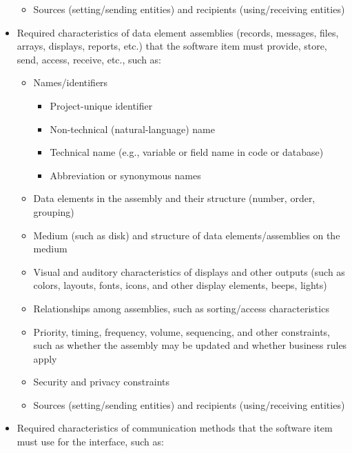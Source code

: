 \begin{itemize}
\begin{itemize}
\item Sources (setting/sending entities) and recipients (using/receiving entities)

\end{itemize}
\item Required characteristics of data element assemblies (records, messages, files, arrays, displays, reports, etc.) that the software item must provide, store, send, access, receive, etc., such as:

\begin{itemize}
\item Names/identifiers

\begin{itemize}
\item Project-unique identifier

\item Non-technical (natural-language) name

\item Technical name (e.g., variable or field name in code or database)

\item Abbreviation or synonymous names

\end{itemize}
\item Data elements in the assembly and their structure (number, order, grouping)

\item Medium (such as disk) and structure of data elements/assemblies on the medium

\item Visual and auditory characteristics of displays and other outputs (such as colors, layouts, fonts, icons, and other display elements, beeps, lights)

\item Relationships among assemblies, such as sorting/access characteristics

\item Priority, timing, frequency, volume, sequencing, and other constraints, such as whether the assembly may be updated and whether business rules apply

\item Security and privacy constraints

\item Sources (setting/sending entities) and recipients (using/receiving entities)

\end{itemize}
\item Required characteristics of communication methods that the software item must use for the interface, such as:


\end{itemize}
